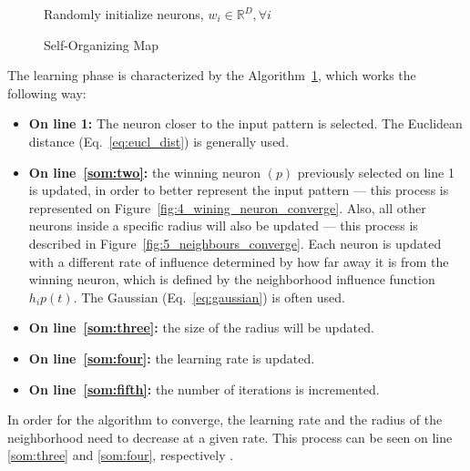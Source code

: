 \begin{figure}[h]
  \begin{algorithm}[H]
    \label{alg:som}
    \DontPrintSemicolon
    Randomly initialize neurons, $w_i \in \mathbb{R}^{D}, \forall i $ \;
      \caption{Self-Organizing Map \cite[]{Kohonen1990} }
  \end{algorithm}
\end{figure}

The learning phase is characterized by the Algorithm~\ref{alg:som}, which works the following way:
\begin{itemize}
  \item \textbf{On line 1:} The neuron closer to the input pattern is selected. The Euclidean distance (Eq.~\ref{eq:eucl_dist}) is generally used.
    
  \item \textbf{On line~\ref{som:two}:} the winning neuron $(p)$ previously selected on line 1 is updated, in order to better represent the input pattern --- this process is represented on Figure~\ref{fig:4_wining_neuron_converge}. Also, all other neurons inside a specific radius will also be updated --- this process is described in Figure~\ref{fig:5_neighbours_converge}. Each neuron is updated with a different rate of influence determined by how far away it is from the winning neuron, which is defined by the neighborhood influence function $h_ip(t)$. The Gaussian (Eq.~\ref{eq:gaussian}) is often used. 
    
  \item \textbf{On line~\ref{som:three}:} the size of the radius will be updated.
  \item \textbf{On line~\ref{som:four}:} the learning rate is updated.
  \item \textbf{On line~\ref{som:fifth}:} the number of iterations is incremented.
\end{itemize}
 
In order for the algorithm to converge, the learning rate and the radius of the neighborhood need to decrease at a given rate. This process can be seen on line \ref{som:three} and \ref{som:four}, respectively .
